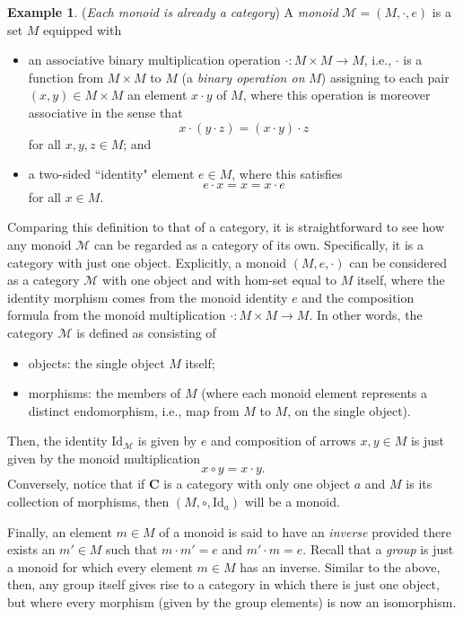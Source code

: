 \documentclass[11pt]{book}
\theoremstyle{definition}
\newtheorem{example}{Example}[section]
\theoremstyle{definition}
\theoremstyle{definition}
\theoremstyle{theorem}
\theoremstyle{definition}
\begin{document}
\begin{example}
 (\textit{Each monoid is already a category}) A \textit{monoid}  $\mathcal{M} = (M, \cdot, e)$ is a set $M$ equipped with 
	\begin{itemize} 
		\item an associative binary multiplication operation $\cdot: M \times M \rightarrow M$, i.e., $\cdot$ is a function from $M \times M$ to $M$ (a \textit{binary operation on} $M$) assigning to each pair $(x,y) \in M \times M$ an element $x \cdot y$ of $M$, where this operation is moreover associative in the sense that 
		\begin{equation*}
		x \cdot (y \cdot z) = (x \cdot y) \cdot z
		\end{equation*} 
		for all $x, y, z \in M$; and  
		\item a two-sided ``identity" element $e \in M$, where this satisfies 
		\begin{equation*}
		e \cdot x = x = x \cdot e
		\end{equation*}  
		for all $x \in M$.  
	\end{itemize} 
	Comparing this definition to that of a category, it is straightforward to see how any monoid $\mathcal{M}$ can be regarded as a category of its own. Specifically, it is a category with just one object. Explicitly, a monoid $(M, e, \cdot)$ can be considered as a category $\mathcal{M}$ with one object and with hom-set equal to $M$ itself, where the identity morphism comes from the monoid identity $e$ and the composition formula from the monoid multiplication $\cdot:M \times M \rightarrow M$. In other words, the category $\mathcal{M}$ is defined as consisting of 
	\begin{itemize}
		\item objects: the single object $M$ itself; 
		\item morphisms: the members of $M$ (where each monoid element represents a distinct endomorphism, i.e., map from $M$ to $M$, on the single object). 
	\end{itemize}
Then, the identity $\text{Id}_{\mathcal{M}}$ is given by $e$ and composition of arrows $x, y \in M$ is just given by the monoid multiplication 
\begin{equation*}
x \circ y = x \cdot y. 
\end{equation*}
Conversely, notice that if $\textbf{C}$ is a category with only one object $a$ and $M$ is its collection of morphisms, then $(M, \circ, \text{Id}_a)$ will be a monoid. \par 
Finally, an element $m \in M$ of a monoid is said to have an \textit{inverse} provided there exists an $m' \in M$ such that $m \cdot m' = e$ and $m' \cdot m = e$. Recall that a \textit{group} is just a monoid for which every element $m \in M$ has an inverse. Similar to the above, then, any group itself gives rise to a category in which there is just one object, but where every morphism (given by the group elements) is now an isomorphism. 
\end{example}
\end{document}
